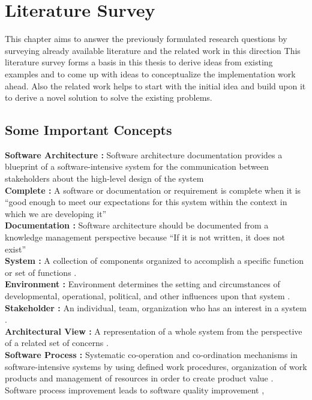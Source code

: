 \chapter{Literature Survey}\label{chapter:LiteratureSurvey}

This chapter aims to answer the previously formulated research questions by surveying already available literature and the related work in this direction This literature survey forms a basis in this thesis to derive ideas from existing examples and to come up with ideas to conceptualize the implementation work ahead. Also the related work helps to start with the initial idea and build upon it to derive a novel solution to solve the existing problems.
\section{Some Important Concepts}
\indent \textbf{Software Architecture : } Software architecture documentation provides a blueprint of a software-intensive system for the communication between stakeholders about the high-level design of the system \cite{6923128}
\newline
\\\indent \textbf{Complete : } A software or documentation or requirement is complete when it is \enquote{good enough to meet our expectations for this system within the context in which we are developing it}  \cite{BachmannDocumentingSoftware2010}
\newline
\\\indent \textbf{Documentation : } Software architecture should be documented from a knowledge management perspective because \enquote{If it is not written, it does not exist} \cite{bab2009}
\newline
\\\indent \textbf{System : }A collection of components organized to accomplish a specific function or set of functions \cite{Standard2007}.
\newline
\\\indent \textbf{Environment : }Environment determines the setting and circumstances of developmental, operational, political, and other influences upon that system \cite{Standard2007}. 
\newline
\\\indent \textbf{Stakeholder : } An individual, team, organization who has an interest in a system \cite{Standard2007}.
\newline
\\\indent \textbf{Architectural View : } A representation of a whole system from the perspective of a related set of concerns \cite{Standard2007}.
\newline
\\\indent \textbf{Software Process : } Systematic co-operation and co-ordination mechanisms in software-intensive systems by using defined work procedures, organization of work products and management of resources in order to create product value \cite{munch2012software}.
\\\indent Software process improvement leads to software quality improvement \cite{Fuggeffa1988}, \cite{Lavallee2011}

